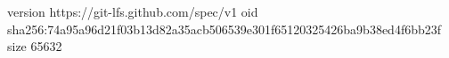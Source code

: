 version https://git-lfs.github.com/spec/v1
oid sha256:74a95a96d21f03b13d82a35acb506539e301f65120325426ba9b38ed4f6bb23f
size 65632
